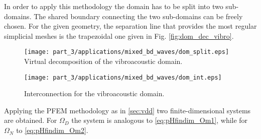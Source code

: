 In order to apply this methodology the domain has to be split into two sub-domains. The shared boundary connecting the two sub-domains can be freely chosen. For the given geometry, the separation line that provides the most regular simplicial meshes is the trapezoidal one given in Fig. \ref{fig:dom_dec_vibro}. 
\begin{figure}[t]
	\begin{minipage}[b]{0.48\linewidth}
			\centering
			\texttt{[image: part\_3/applications/mixed\_bd\_waves/dom\_split.eps]} \\
			\caption{Virtual decomposition of the vibroacoustic domain.}
			\label{fig:dom_dec_vibro}
	\end{minipage}
	\hspace{0.5cm}
	\begin{minipage}[b]{0.48\linewidth}
		\centering
		\texttt{[image: part\_3/applications/mixed\_bd\_waves/dom\_int.eps]}
		\caption{Interconnection for the vibroacoustic domain.}
		\label{fig:dom_int_vibro}
	\end{minipage}
\end{figure}

Applying the PFEM methodology as in \ref{sec:vdd} two finite-dimensional systems are obtained. For $\Omega_D$ the system is analogous to \eqref{eq:pHfindim_Om1}, while 
for $\Omega_N$ to \eqref{eq:pHfindim_Om2}.

